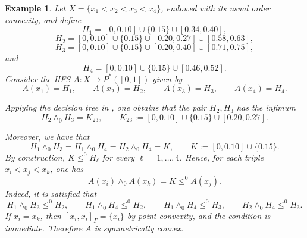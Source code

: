 \documentclass[11pt,a4paper]{article}
\newtheorem{example}{Example}
\begin{document}
\begin{example}\label{ex7}
Let \(X=\{x_1<x_2<x_3<x_4\}\), endowed with its usual order convexity, and define
\[
H_1=[0,0.10]\cup\{0.15\}\cup[0.34,0.40],
\]
\[
H_2=[0,0.10]\cup\{0.15\}\cup[0.20,0.27]\cup[0.58,0.63],
\]
\[
H_3=[0,0.10]\cup\{0.15\}\cup[0.20,0.40]\cup[0.71,0.75],
\]
and
\[
H_4=[0,0.10]\cup\{0.15\}\cup[0.46,0.52].
\]
Consider the HFS \(A:X\to P^*([0,1])\) given by
\[
A(x_1)=H_1,\qquad
A(x_2)=H_2,\qquad
A(x_3)=H_3,\qquad
A(x_4)=H_4.
\]

Applying the decision tree in \cite{JMNS22}, one obtains that the pair \(H_2,H_3\) has the infimum
\[
H_2\wedge_0 H_3
=
K_{23},
\qquad
K_{23}:=[0,0.10]\cup\{0.15\}\cup[0.20,0.27].
\]

Moreover, we have that
\[
H_1\wedge_0 H_3
=
H_1\wedge_0 H_4
=
H_2\wedge_0 H_4
=
K,
\qquad
K:=[0,0.10]\cup\{0.15\}.
\]
By construction, \(K\leq^0 H_\ell\) for every \(\ell=1,\ldots,4\). Hence, for each triple \(x_i<x_j<x_k\), one has
\[
A(x_i)\wedge_0 A(x_k)=K\leq^0 A(x_j).
\]
Indeed, it is satisfied that
\[
H_1\wedge_0 H_3\leq^0 H_2,\qquad
H_1\wedge_0 H_4\leq^0 H_2,\qquad
H_1\wedge_0 H_4\leq^0 H_3,\qquad
H_2\wedge_0 H_4\leq^0 H_3.
\]
If \(x_i=x_k\), then \([x_i,x_i]_{\Gamma}=\{x_i\}\) by point-convexity, and the condition is immediate. Therefore \(A\) is symmetrically convex.

\begin{figure}[htbp]
\centering
{}
\end{figure}
\end{example}
\end{document}
